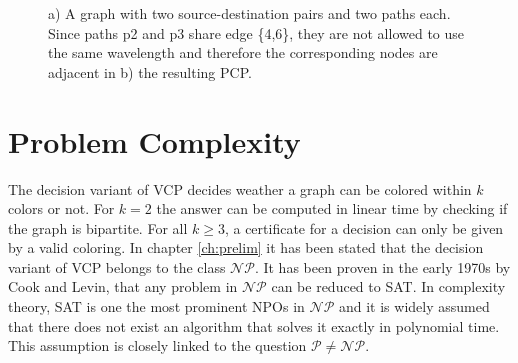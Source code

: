 \begin{center}
\begin{figure}

\caption{a) A graph with two source-destination pairs and two paths each. Since paths p2 and p3 share edge \{4,6\}, they are not allowed to use the same wavelength and therefore the corresponding nodes are adjacent in b) the resulting PCP.}
\label{pd:transformation}
\end{figure}
\end{center}


\section{Problem Complexity}

The decision variant of VCP decides weather a graph can be colored within $k$ colors or not. For $k=2$ the answer can be computed in linear time by checking if the graph is bipartite. For all $k\geq 3$, a certificate for a decision can only be given by a valid coloring. In chapter \ref{ch:prelim} it has been stated that the decision variant of VCP belongs to the class $\mathcal{NP}$. It has been proven in the early 1970s by Cook and Levin, that any problem in $\mathcal{NP}$ can be reduced to SAT. In complexity theory, SAT is one the most prominent NPOs in $\mathcal{NP}$ and it is widely assumed that there does not exist an algorithm that solves it exactly in polynomial time. This assumption is closely linked to the question $\mathcal{P} \neq \mathcal{NP}$.

